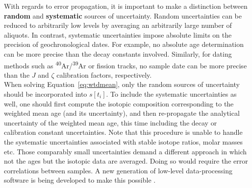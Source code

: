 \begin{refsection}
With regards to error propagation, it is important to make a
distinction between \textbf{random} and \textbf{systematic} sources of
uncertainty. Random uncertainties can be reduced to arbitrarily low
levels by averaging an arbitrarily large number of aliquots. In
contrast, systematic uncertainties impose absolute limits on the
precision of geochronological dates.  For example, no absolute age
determination can be more precise than the decay constants
involved. Similarly, for dating methods such as
\textsuperscript{40}Ar/\textsuperscript{39}Ar or fission tracks, no
sample date can be more precise than the $J$ and $\zeta$ calibration
factors, respectively.\\

When solving Equation~\ref{eq:wtdmean}, only the random sources of
uncertainty should be incorporated into $s[t_i]$.  To include the
systematic uncertainties as well, one should first compute the
isotopic composition corresponding to the weighted mean age (and its
uncertainty), and then re-propagate the analytical uncertainty of the
weighted mean age, this time including the decay or calibration
constant uncertainties. Note that this procedure is unable to handle
the systematic uncertainties associated with stable isotope ratios,
molar masses etc. Those comparably small uncertainties demand a
different approach in which not the ages but the isotopic data are
averaged.  Doing so would require the error correlations between
samples. A new generation of low-level data-processing software is
being developed to make this possible
\citep{vermeesch2015b,mclean2016}.


\end{refsection}
